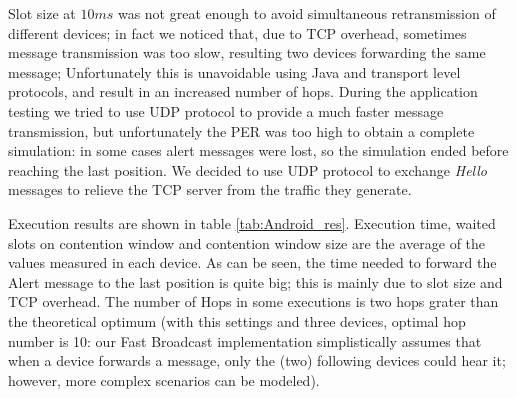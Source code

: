

Slot size at $10ms$ was not great enough to avoid simultaneous retransmission of different devices; in fact we noticed that, due to TCP overhead, sometimes message transmission was too slow, resulting two devices forwarding the same message; Unfortunately this is unavoidable using Java and transport level protocols, and result in an increased number of hops.
During the application testing we tried to use UDP protocol to provide a much faster message transmission, but unfortunately the PER was too high to obtain a complete simulation: in some cases alert messages were lost, so the simulation ended before reaching the last position. We decided to use UDP protocol to exchange \textit{Hello} messages to relieve the TCP server from the traffic they generate.

Execution results are shown in table \ref{tab:Android_res}. Execution time, waited slots on contention window and contention window size are the average of the values measured in each device. As can be seen, the time needed to forward the Alert message to the last position is quite big; this is mainly due to slot size and TCP overhead. The number of Hops in some executions is two hops grater than the theoretical optimum (with this settings and three devices, optimal hop number is 10: our Fast Broadcast implementation simplistically assumes that when a device forwards a message, only the (two) following devices could hear it; however, more complex scenarios can be modeled).

